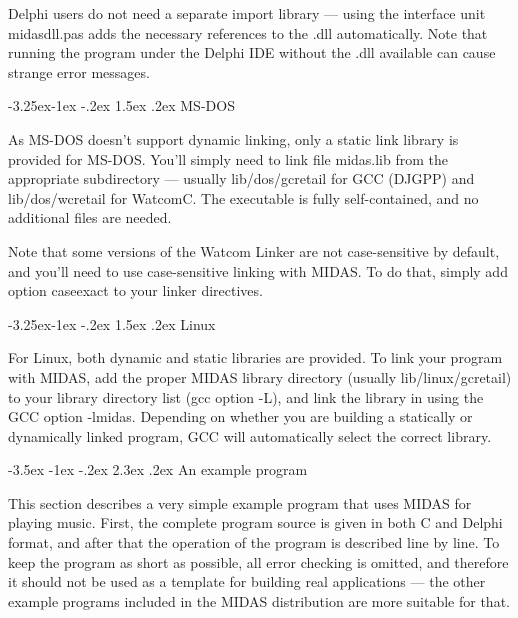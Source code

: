 \documentclass[a4paper,12pt,oneside]{book}
\makeatletter
\renewcommand\section{\@startsection {section}{1}{-20pt}%
                                   {-3.5ex \@plus -1ex \@minus -.2ex}%
                                   {2.3ex \@plus.2ex}%
                                   {\normalfont\Large\bfseries}}
\renewcommand\subsection{\@startsection{subsection}{2}{-20pt}%
                                     {-3.25ex\@plus -1ex \@minus -.2ex}%
                                     {1.5ex \@plus .2ex}%
                                     {\normalfont\large\bfseries}}
\newcommand{\mResWord}[1]{{\ttfamily #1}}
\newcommand{\mFileName}[1]{{\ttfamily #1}}
\makeatother
\begin{document}
Delphi users do not need a separate import library --- using the interface
unit \mFileName{midasdll.pas} adds the necessary references to the
\mFileName{.dll} automatically. Note that running the program under the
Delphi IDE without the \mFileName{.dll} available can cause strange error
messages.



\subsection{MS-DOS}

As MS-DOS doesn't support dynamic linking, only a static link library is
provided for MS-DOS. You'll simply need to link file \mFileName{midas.lib}
from the appropriate subdirectory --- usually
\mFileName{lib/dos/gcretail} for GCC (DJGPP) and
\mFileName{lib/dos/wcretail} for WatcomC. The executable is fully
self-contained, and no additional files are needed.

Note that some versions of the Watcom Linker are not case-sensitive by
default, and you'll need to use case-sensitive linking with MIDAS. To do
that, simply add \mResWord{option caseexact} to your linker directives.



\subsection{Linux}

For Linux, both dynamic and static libraries are provided. To link your
program with MIDAS, add the proper MIDAS library directory (usually
\mFileName{lib/linux/gcretail}) to your library directory
list (gcc option \mResWord{-L}), and link the library in using the GCC option
\mResWord{-lmidas}. Depending on whether you are building a statically or
dynamically linked program, GCC will automatically select the correct
library.



\section{An example program}

This section describes a very simple example program that uses MIDAS for
playing music. First, the complete program source is given in both C and
Delphi format, and after that the operation of the program is described line
by line. To keep the program as short as possible, all error checking is
omitted, and therefore it should not be used as a template for building real
applications --- the other example programs included in the MIDAS
distribution are more suitable for that.
\end{document}
